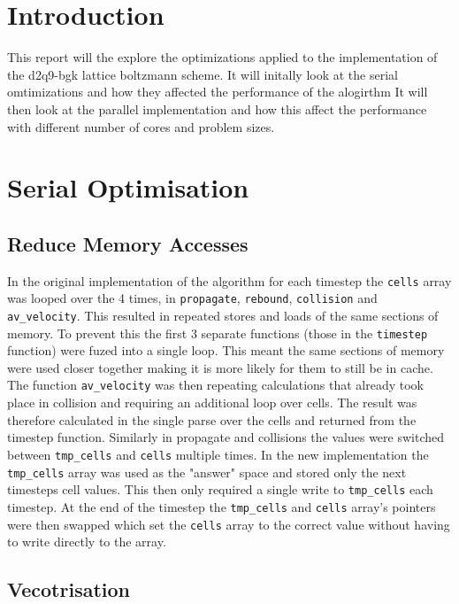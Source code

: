\documentclass{article}
\begin{document}
\begin{multicols}{2}

\section{Introduction}

This report will the explore the optimizations applied to the implementation of
the d2q9-bgk lattice boltzmann scheme. It will initally look at the serial
omtimizations and how they affected the performance of the alogirthm It will
then look at the parallel implementation and how this affect the performance
with different number of cores and problem sizes.

\section{Serial Optimisation}

\subsection{Reduce Memory Accesses}
In the original implementation of the algorithm for each timestep the
\verb|cells| array was looped over the 4 times, in \verb|propagate|,
\verb|rebound|, \verb|collision| and \verb|av_velocity|. This resulted in
repeated stores and loads of the same sections of memory. To prevent this the
first 3 separate functions (those in the \verb|timestep| function) were fuzed
into a single loop. This meant the same sections of memory were used closer
together making it is more likely for them to still be in cache. The function
\verb|av_velocity| was then repeating calculations that already took place in
collision and requiring an additional loop over cells. The result was therefore
calculated in the single parse over the cells and returned from the timestep
function. Similarly in propagate and collisions the values were switched
between \verb|tmp_cells| and \verb|cells| multiple times. In the new
implementation the \verb|tmp_cells| array was used as the "answer" space and
stored only the next timesteps cell values. This then only required a single
write to \verb|tmp_cells| each timestep. At the end of the timestep the
\verb|tmp_cells| and \verb|cells| array's pointers were then swapped which set
the \verb|cells| array to the correct value without having to write directly to
the array.

\subsection{Vecotrisation}


\end{multicols}
\end{document}

